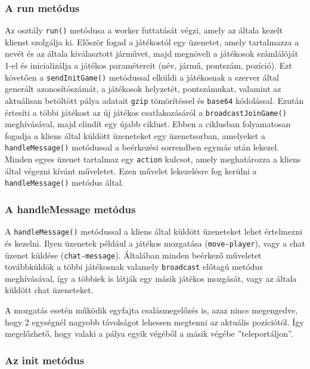 \subsubsection{A run metódus}

Az osztály \verb|run()| metódusa a worker futtatását végzi, amely az általa kezelt klienst szolgálja ki. Először fogad a játékostól egy üzenetet, amely tartalmazza a nevét és az általa kiválasztott járművet, majd megnöveli a játékosok számlálóját 1-el és inicializálja a játékos paramétereit (név, jármű, pontszám, pozíció). Ezt követően a \verb|sendInitGame()| metódussal elküldi a játékosnak a szerver által generált azonosítószámát, a játékosok helyzetét, pontszámukat, valamint az aktuálisan betöltött pálya adatait \verb|gzip| \cite{gzip} tömörítéssel és \verb|base64| \cite{base64} kódolással. Ezután értesíti a többi játékost az új játékos csatlakozásáról a \verb|broadcastJoinGame()| meghívásával, majd elindít egy újabb ciklust. Ebben a ciklusban folyamatosan fogadja a kliens által küldött üzeneteket egy üzenetsorban, amelyeket a \verb|handleMessage()| metódussal a beérkezési sorrendben egymás után lekezel. Minden egyes üzenet tartalmaz egy \verb|action| kulcsot, amely meghatározza a kliens által végezni kívánt műveletet. Ezen művelet lekezelésre fog kerülni a \verb|handleMessage()| metódus által.

\subsubsection{A handleMessage metódus}

A \verb|handleMessage()| metódussal a kliens által küldött üzeneteket lehet értelmezni és kezelni. Ilyen üzenetek például a játékos mozgatása (\verb|move-player|), vagy a chat üzenet küldése (\verb|chat-message|). Általában minden beérkező műveletet továbbküldök a többi játékosnak valamely \verb|broadcast| előtagú metódus meghívásával, így a többiek is látják egy másik játékos mozgását, vagy az általa küldött chat üzeneteket.

A mozgatás esetén működik egyfajta csalásmegelőzés is, azaz nincs megengedve, hogy 2 egységnél nagyobb távolságot lehessen megtenni az aktuális pozíciótól. Így megelőzhető, hogy valaki a pálya egyik végéből a másik végébe ''teleportáljon''.

\subsubsection{Az init metódus}

